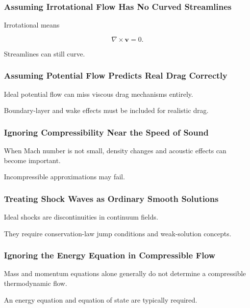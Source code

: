 \subsubsection{Assuming Irrotational Flow Has No Curved Streamlines}

Irrotational means

\[
\nabla\times\mathbf{v}=0.
\]

Streamlines can still curve.

\subsubsection{Assuming Potential Flow Predicts Real Drag Correctly}

Ideal potential flow can miss viscous drag mechanisms entirely.

Boundary-layer and wake effects must be included for realistic drag.

\subsubsection{Ignoring Compressibility Near the Speed of Sound}

When Mach number is not small, density changes and acoustic effects can become
important.

Incompressible approximations may fail.

\subsubsection{Treating Shock Waves as Ordinary Smooth Solutions}

Ideal shocks are discontinuities in continuum fields.

They require conservation-law jump conditions and weak-solution concepts.

\subsubsection{Ignoring the Energy Equation in Compressible Flow}

Mass and momentum equations alone generally do not determine a compressible
thermodynamic flow.

An energy equation and equation of state are typically required.

